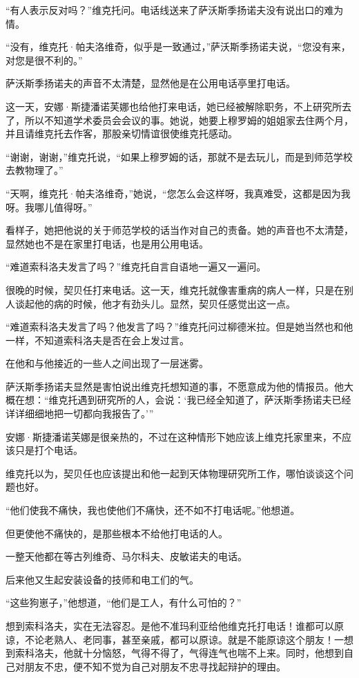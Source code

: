 “有人表示反对吗？”维克托问。电话线送来了萨沃斯季扬诺夫没有说出口的难为情。

“没有，维克托·帕夫洛维奇，似乎是一致通过，”萨沃斯季扬诺夫说，“您没有来，对您是很不利的。”

萨沃斯季扬诺夫的声音不太清楚，显然他是在公用电话亭里打电话。

这一天，安娜·斯捷潘诺芙娜也给他打来电话，她已经被解除职务，不上研究所去了，所以不知道学术委员会会议的事。她说，她要上穆罗姆的姐姐家去住两个月，并且请维克托去作客，那股亲切情谊很使维克托感动。

“谢谢，谢谢，”维克托说，“如果上穆罗姆的话，那就不是去玩儿，而是到师范学校去教物理了。”

“天啊，维克托·帕夫洛维奇，”她说，“您怎么会这样呀，我真难受，这都是因为我呀。我哪儿值得呀。”

看样子，她把他说的关于师范学校的话当作对自己的责备。她的声音也不太清楚，显然她也不是在家里打电话，也是用公用电话。

“难道索科洛夫发言了吗？”维克托自言自语地一遍又一遍问。

很晚的时候，契贝任打来电话。这一天，维克托就像害重病的病人一样，只是在别人谈起他的病的时候，他才有劲头儿。显然，契贝任感觉出这一点。

“难道索科洛夫发言了吗？他发言了吗？”维克托问过柳德米拉。但是她当然也和他一样，不知道索科洛夫是否在会上发过言。

在他和与他接近的一些人之间出现了一层迷雾。

萨沃斯季扬诺夫显然是害怕说出维克托想知道的事，不愿意成为他的情报员。他大概在想：“维克托遇到研究所的人，会说：‘我已经全知道了，萨沃斯季扬诺夫已经详详细细地把一切都向我报告了。’”

安娜·斯捷潘诺芙娜是很亲热的，不过在这种情形下她应该上维克托家里来，不应该只是打个电话。

维克托以为，契贝任也应该提出和他一起到天体物理研究所工作，哪怕谈谈这个问题也好。

“他们使我不痛快，我也使他们不痛快，还不如不打电话呢。”他想道。

但更使他不痛快的，是那些根本不给他打电话的人。

一整天他都在等古列维奇、马尔科夫、皮敏诺夫的电话。

后来他又生起安装设备的技师和电工们的气。

“这些狗崽子，”他想道，“他们是工人，有什么可怕的？”

想到索科洛夫，实在无法容忍。是他不准玛利亚给他维克托打电话！谁都可以原谅，不论老熟人、老同事，甚至亲戚，都可以原谅。就是不能原谅这个朋友！一想到索科洛夫，他就十分恼怒，气得不得了，气得连气也喘不上来。同时，他想到自己对朋友不忠，便不知不觉为自己对朋友不忠寻找起辩护的理由。

